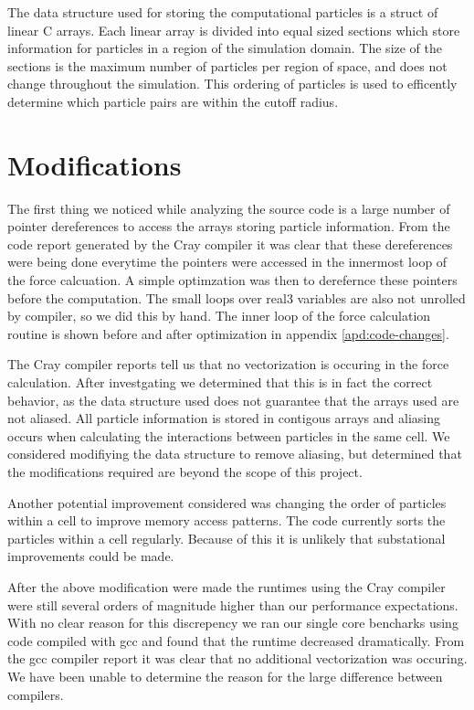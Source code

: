 \documentclass[12pt]{article}
\begin{document}
The data structure used for storing the computational particles is a
struct of linear C arrays. Each linear array is divided into equal
sized sections which store information for particles in a region of
the simulation domain. The size of the sections is the maximum number
of particles per region of space, and does not change throughout the
simulation. This ordering of particles is used to efficently determine
which particle pairs are within the cutoff radius.




\section{Modifications}
The first thing we noticed while analyzing the source code is a large
number of pointer dereferences to access the arrays storing particle
information. From the code report generated by the Cray compiler it
was clear that these dereferences were being done everytime the
pointers were accessed in the innermost loop of the force
calcuation. A simple optimzation was then to derefernce these pointers
before the computation. The small loops over real3 variables are also
not unrolled by compiler, so we did this by hand. The inner loop of
the force calculation routine is shown before and after optimization
in appendix \ref{apd:code-changes}.

The Cray compiler reports tell us that no vectorization is occuring in
the force calculation. After investgating we determined that this is
in fact the correct behavior, as the data structure used does not
guarantee that the arrays used are not aliased. All particle
information is stored in contigous arrays and aliasing occurs when
calculating the interactions between particles in the same cell. We
considered modifiying the data structure to remove aliasing, but
determined that the modifications required are beyond the scope of
this project.

Another potential improvement considered was changing the order of
particles within a cell to improve memory access patterns. The code
currently sorts the particles within a cell regularly. Because of this
it is unlikely that substational improvements could be made.

After the above modification were made the runtimes using the Cray
compiler were still several orders of magnitude higher than our
performance expectations. With no clear reason for this discrepency we
ran our single core bencharks using code compiled with gcc and found
that the runtime decreased dramatically. From the gcc compiler report
it was clear that no additional vectorization was occuring. We have
been unable to determine the reason for the large difference between
compilers.
\end{document}
